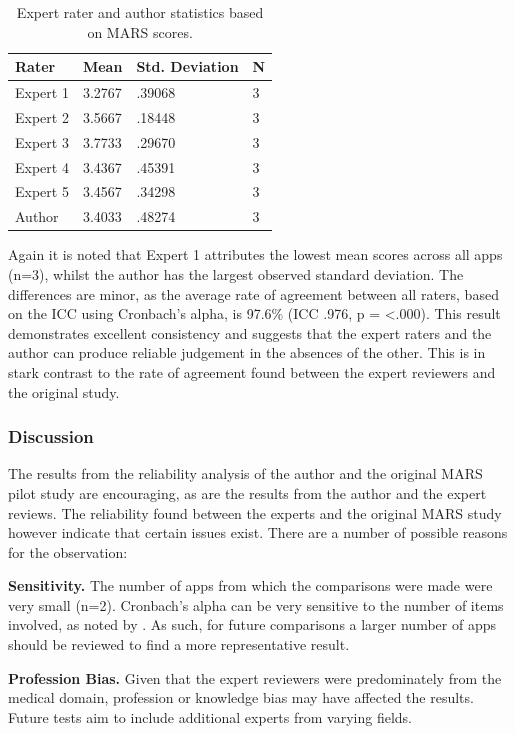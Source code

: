\begin{table}[h]
\centering
\caption{Expert rater and author statistics based on MARS scores.}
\label{tbl: expert-vs-author-apps-descriptive}
\begin{tabular}{@{}llll@{}}
\toprule
Rater      & Mean   & Std. Deviation & N \\ \midrule
Expert 1   & 3.2767 & .39068         & 3 \\
Expert 2 & 3.5667 & .18448         & 3 \\
Expert 3 & 3.7733 & .29670         & 3 \\
Expert 4  & 3.4367 & .45391         & 3 \\
Expert 5  & 3.4567 & .34298         & 3 \\
Author     & 3.4033 & .48274         & 3 \\ \bottomrule
\end{tabular}
\end{table}

Again it is noted that Expert 1 attributes the lowest mean scores across all apps (n=3), whilst the author has the largest observed standard deviation. The differences are minor, as the average rate of agreement between all raters, based on the ICC using Cronbach's alpha, is 97.6\% (ICC .976, p = \textless .000). This result demonstrates excellent consistency and suggests that the expert raters and the author can produce reliable judgement in the absences of the other. This is in stark contrast to the rate of agreement found between the expert reviewers and the original study.

\subsubsection{Discussion}
The results from the reliability analysis of the author and the original MARS pilot study are encouraging, as are the results from the author and the expert reviews. The reliability found between the experts and the original MARS study however indicate that certain issues exist. There are a number of possible reasons for the observation: 

\textbf{Sensitivity.}
The number of apps from which the comparisons were made were very small (n=2). Cronbach’s alpha can be very sensitive to the number of items involved, as noted by \citeauthor{Clark1995} \cite{Clark1995}. As such, for future comparisons a larger number of apps should be reviewed to find a more representative result.

\textbf{Profession Bias.}
Given that the expert reviewers were predominately from the medical domain, profession or knowledge bias may have affected the results. Future tests aim to include additional experts from varying fields.

